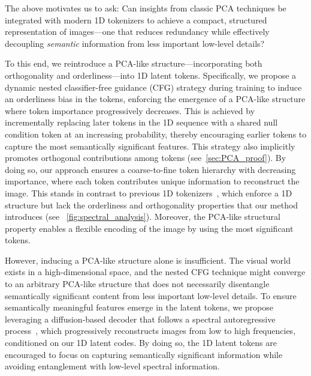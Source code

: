 \documentclass[10pt,twocolumn,letterpaper]{article}
\begin{document}
The above motivates us to ask: Can insights from classic PCA techniques be integrated with modern 1D tokenizers to achieve a compact, structured representation of images---one that reduces redundancy while effectively decoupling \textit{semantic} information from less important low-level details?

To this end, we reintroduce a PCA-like structure---incorporating both orthogonality and orderliness---into 1D latent tokens.
Specifically, we propose a dynamic nested classifier-free guidance (CFG) strategy during training to induce an orderliness bias in the tokens, enforcing the emergence of a PCA-like structure where token importance progressively decreases. This is achieved by incrementally replacing later tokens in the 1D sequence with a shared null condition token at an increasing probability, thereby encouraging earlier tokens to capture the most semantically significant features. This strategy also implicitly promotes orthogonal contributions among tokens (see~\cref{sec:PCA_proof}).
By doing so, our approach ensures a coarse-to-fine token hierarchy with decreasing importance, where each token contributes unique information to reconstruct the image. 
This stands in contrast to previous 1D tokenizers~\cite{titok,alit}, which enforce a 1D structure but lack the orderliness and orthogonality properties that our method introduces (see ~\cref{fig:spectral_analysis}).  
Moreover, the PCA-like structural property enables a flexible encoding of the image by using the most significant tokens.







However, inducing a PCA-like structure alone is insufficient. The visual world exists in a high-dimensional space, and the nested CFG technique might converge to an arbitrary PCA-like structure that does not necessarily disentangle semantically significant content from less important low-level details.
To ensure semantically meaningful features emerge in the latent tokens, we propose leveraging a diffusion-based decoder that follows a spectral autoregressive process~\cite{diffusion_is_spectral_ar,rissanen2022generative}, which progressively reconstructs images from low to high frequencies, conditioned on our 1D latent codes. By doing so, the 1D latent tokens are encouraged to focus on capturing semantically significant information while avoiding entanglement with low-level spectral information.
\end{document}
